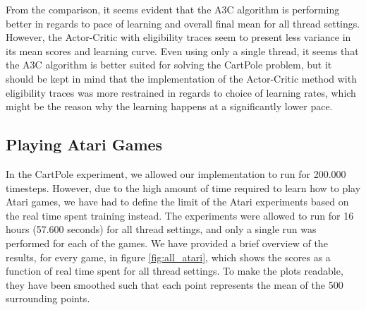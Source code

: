 \documentclass[11pt]{article}
\begin{document}
From the comparison, it seems evident that the A3C algorithm is performing
better in regards to pace of learning and overall final mean for all thread settings.
However, the Actor-Critic with eligibility traces seem to present less variance
in its mean scores and learning curve.
Even using only a single thread, it seems that the A3C algorithm
is better suited for solving the CartPole problem, but it should
be kept in mind that the implementation of the Actor-Critic method
with eligibility traces was more restrained in regards to choice of
learning rates, which might be the reason why the learning happens
at a significantly lower pace.

\subsection{Playing Atari Games}

In the CartPole experiment, we allowed our implementation to run for 200.000 timesteps.
However, due to the high amount of time required to
learn how to play Atari games, we have had to define the limit of the
Atari experiments based on the real time spent training instead.
The experiments were allowed to run for 16 hours (57.600 seconds)
for all thread settings, and only a single run was performed for
each of the games.
We have provided a brief overview of the results, for every game, in figure \ref{fig:all_atari},
which shows the scores as a function of real time spent for all
thread settings.
To make the plots readable, they have been smoothed such that
each point represents the mean of the 500 surrounding points.
\end{document}
